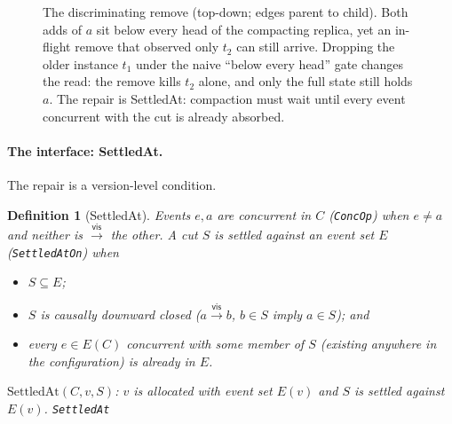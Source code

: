 \documentclass[11pt]{article}
\newtheorem{definition}[theorem]{Definition}
\newcommand{\vis}{\xrightarrow{\mathsf{vis}}}
\newcommand{\add}{\mathsf{add}}
\newcommand{\rem}{\mathsf{rem}}
\newcommand{\lean}[1]{\texttt{#1}}
\begin{document}
\begin{figure}[t]
\centering
{}
\caption{The discriminating remove (top-down; edges parent to child).
Both adds of $a$ sit below every head of the compacting replica, yet an
in-flight remove that observed only $t_2$ can still arrive. Dropping
the older instance $t_1$ under the naive ``below every head'' gate
changes the read: the remove kills $t_2$ alone, and only the full state
still holds $a$. The repair is SettledAt: compaction must wait until
every event concurrent with the cut is already absorbed.}
\label{fig:discrem}
\end{figure}

\paragraph{The interface: SettledAt.} The repair is a version-level
condition.

\begin{definition}[SettledAt]
\label{def:settled}
Events $e, a$ are \emph{concurrent} in $C$ (\lean{ConcOp}) when
$e \neq a$ and neither is $\vis$ the other. A cut $S$ is settled
against an event set $E$ (\lean{SettledAtOn}) when
\begin{itemize}[leftmargin=2.2em]
\item[(i)] $S \subseteq E$;
\item[(ii)] $S$ is causally downward closed ($a \vis b$, $b \in S$
  imply $a \in S$); and
\item[(iii)] every $e \in E(C)$ concurrent with some member of $S$
  (\emph{existing anywhere in the configuration}) is already in $E$.
\end{itemize}
$\mathrm{SettledAt}(C, v, S)$: $v$ is allocated with event set $E(v)$
and $S$ is settled against $E(v)$.
\hfill\lean{SettledAt}
\end{definition}
\end{document}
